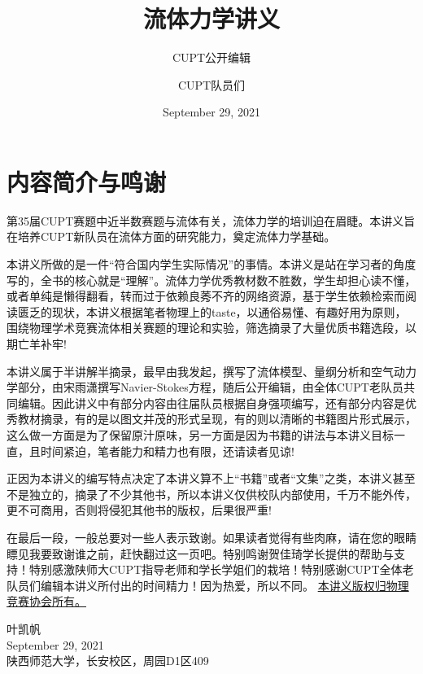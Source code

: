 \documentclass[cn,11pt,newtx,citestyle=gb7714-2015,bibstyle=gb7714-2015]{elegantbook}
\title{流体力学讲义}
\subtitle{CUPT公开编辑}
\author{CUPT队员们}
\institute{陕师大物信院-物理竞赛协会-学术竞赛部}
\date{September 29, 2021}
\begin{document}
\renewcommand\theequation{\arabic{chapter}-\arabic{section}-\arabic{equation}}%

\maketitle
\frontmatter

\chapter{内容简介与鸣谢}

第35届CUPT赛题中近半数赛题与流体有关，流体力学的培训迫在眉睫。本讲义旨在培养CUPT新队员在流体方面的研究能力，奠定流体力学基础。

本讲义所做的是一件“符合国内学生实际情况”的事情。本讲义是站在学习者的角度写的，全书的核心就是“理解”。流体力学优秀教材数不胜数，学生却担心读不懂，或者单纯是懒得翻看，转而过于依赖良莠不齐的网络资源，基于学生依赖检索而阅读匮乏的现状，本讲义根据笔者物理上的taste，以通俗易懂、有趣好用为原则，围绕物理学术竞赛流体相关赛题的理论和实验，筛选摘录了大量优质书籍选段，以期亡羊补牢!

本讲义属于半讲解半摘录，最早由我发起，撰写了流体模型、量纲分析和空气动力学部分，由宋雨潇撰写Navier-Stokes方程，随后公开编辑，由全体CUPT老队员共同编辑。因此讲义中有部分内容由往届队员根据自身强项编写，还有部分内容是优秀教材摘录，有的是以图文并茂的形式呈现，有的则以清晰的书籍图片形式展示，这么做一方面是为了保留原汁原味，另一方面是因为书籍的讲法与本讲义目标一直，且时间紧迫，笔者能力和精力也有限，还请读者见谅!

正因为本讲义的编写特点决定了本讲义算不上“书籍”或者“文集”之类，本讲义甚至不是独立的，摘录了不少其他书，所以本讲义仅供校队内部使用，千万不能外传，更不可商用，否则将侵犯其他书的版权，后果很严重!

在最后一段，一般总要对一些人表示致谢。如果读者觉得有些肉麻，请在您的眼睛瞟见我要致谢谁之前，赶快翻过这一页吧。特别鸣谢贺佳琦学长提供的帮助与支持！特别感激陕师大CUPT指导老师和学长学姐们的栽培！特别感谢CUPT全体老队员们编辑本讲义所付出的时间精力！因为热爱，所以不同。
\vskip 0.5cm
\underline{本讲义版权归物理竞赛协会所有。}

\vskip 1.5cm

\begin{flushright}
叶凯帆\\
September 29, 2021\\
陕西师范大学，长安校区，周园D1区409
\end{flushright}
\end{document}
